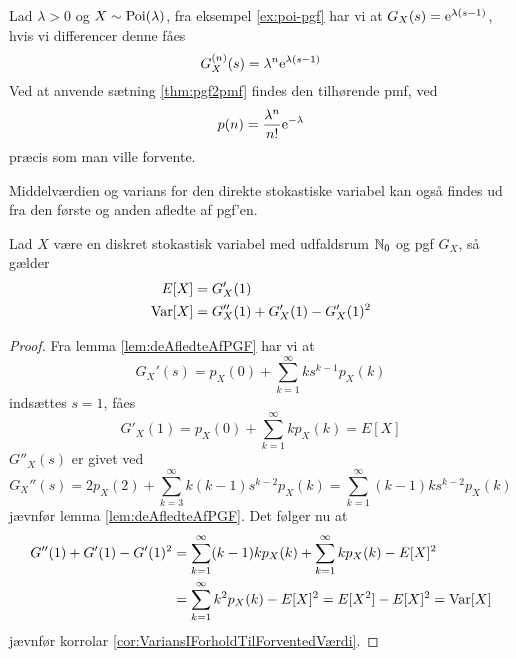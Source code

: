 \begin{exmp}
    Lad $\lambda > 0$ og $X \sim \textnormal{Poi}(\lambda)$, fra eksempel \ref{ex:poi-pgf} har vi at $G_X(s) = \mathrm{e}^{\lambda(s-1)}$, hvis vi differencer denne fåes
    \begin{equation*}
        G^{(n)}_X(s) = \lambda^n\mathrm{e}^{\lambda(s-1)}
    \end{equation*}
    Ved at anvende sætning \ref{thm:pgf2pmf} findes den tilhørende pmf, ved
    \begin{equation*}
        p(n) = \frac{\lambda^n}{n!}\mathrm{e}^{-\lambda}
    \end{equation*}
    præcis som man ville forvente.
\end{exmp}

Middelværdien og varians for den direkte stokastiske variabel kan også findes ud fra den første og anden afledte af pgf'en.
\begin{prop}\label{prop 3.37} %
    Lad $X$ være en diskret stokastisk variabel med udfaldsrum $\mathbb{N}_0$ og pgf $G_X$, så gælder
    \begin{align*}
        E[X]&=G'_X(1)\\
        \textnormal{Var}[X]&=G_X''(1)+G'_X(1)-G'_X(1)^2
    \end{align*}
\end{prop}

\begin{proof}
    Fra lemma \ref{lem:deAfledteAfPGF} har vi at 
    \begin{equation*}
        G_X'(s) = p_X(0) + \sum_{k=1}^\infty ks^{k-1} p_X(k)
    \end{equation*}
    indsættes $s = 1$, fåes
    \begin{equation*}
        G'_X(1) = p_X(0) + \sum^\infty_{k = 1} kp_X(k) = E[X]
    \end{equation*}
    $G''_X(s)$ er givet ved 
    \begin{equation*}
        G_X''(s) = 2p_X(2) + \sum^\infty_{k = 3} k(k-1) s^{k - 2} p_X(k) = \sum_{k=1}^\infty (k-1)ks^{k-2} p_X(k)
    \end{equation*}
    jævnfør lemma \ref{lem:deAfledteAfPGF}. Det følger nu at
    \begin{align*}
        G''(1)+G'(1)-G'(1)^2&=\sum_{k=1}^\infty (k-1)k p_X(k)+\sum_{k=1}^\infty k p_X(k)-E[X]^2\\
        &=\sum_{k=1}^\infty k^2 p_X(k)-E[X]^2
        =E[X^2]-E[X]^2 =\textnormal{Var}[X]
    \end{align*}
    jævnfør korrolar \ref{cor:VariansIForholdTilForventedVærdi}.
\end{proof}


